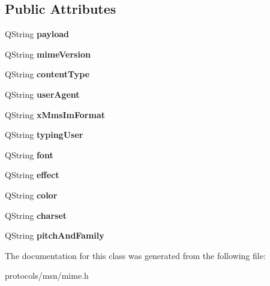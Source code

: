 \subsection*{Public Attributes}
\begin{DoxyCompactItemize}
\item 
\hypertarget{classMime_a1c7bb9724fe9954cf0c7c745a3be5b25}{
QString {\bfseries payload}}
\label{classMime_a1c7bb9724fe9954cf0c7c745a3be5b25}

\item 
\hypertarget{classMime_ab6c9f29d6d8bd11f639fbabda000c741}{
QString {\bfseries mimeVersion}}
\label{classMime_ab6c9f29d6d8bd11f639fbabda000c741}

\item 
\hypertarget{classMime_ab0c4a695d1fe22acfea55b4f7384f5da}{
QString {\bfseries contentType}}
\label{classMime_ab0c4a695d1fe22acfea55b4f7384f5da}

\item 
\hypertarget{classMime_a2d1ca174d77792ba1bd590eb9498cf7d}{
QString {\bfseries userAgent}}
\label{classMime_a2d1ca174d77792ba1bd590eb9498cf7d}

\item 
\hypertarget{classMime_a4139721fc511240ec60402f4db44a92f}{
QString {\bfseries xMmsImFormat}}
\label{classMime_a4139721fc511240ec60402f4db44a92f}

\item 
\hypertarget{classMime_a75b28ee46d80dc7a5fa67c89a41bced5}{
QString {\bfseries typingUser}}
\label{classMime_a75b28ee46d80dc7a5fa67c89a41bced5}

\item 
\hypertarget{classMime_a449c5711e7419e880e6081f9c669e80f}{
QString {\bfseries font}}
\label{classMime_a449c5711e7419e880e6081f9c669e80f}

\item 
\hypertarget{classMime_a3a8ef272711a0bec1af813d7a5797732}{
QString {\bfseries effect}}
\label{classMime_a3a8ef272711a0bec1af813d7a5797732}

\item 
\hypertarget{classMime_ae32bfaced2d5138538ccbdad9477f726}{
QString {\bfseries color}}
\label{classMime_ae32bfaced2d5138538ccbdad9477f726}

\item 
\hypertarget{classMime_a2817ca6fcdb014fb3523cb9969189b70}{
QString {\bfseries charset}}
\label{classMime_a2817ca6fcdb014fb3523cb9969189b70}

\item 
\hypertarget{classMime_a96cc1d6b32ffcaf046b568271d26fe5d}{
QString {\bfseries pitchAndFamily}}
\label{classMime_a96cc1d6b32ffcaf046b568271d26fe5d}

\end{DoxyCompactItemize}


The documentation for this class was generated from the following file:\begin{DoxyCompactItemize}
\item 
protocols/msn/mime.h\end{DoxyCompactItemize}
